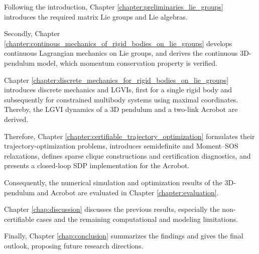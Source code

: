 Following the introduction, Chapter \ref{chapter:preliminaries_lie_groups} 
introduces the required matrix Lie groups and Lie algebras. 

Secondly, Chapter \ref{chapter:continous_mechanics_of_rigid_bodies_on_lie_groups} 
develops continuous Lagrangian mechanics on Lie groups,
and derives the continuous 3D-pendulum model, which momentum conservation
property is verified.

Chapter \ref{chapter:discrete_mechanics_for_rigid_bodies_on_lie_groups}
introduces discrete mechanics and LGVIs, first for a single rigid body
and subsequently for constrained multibody systems using maximal coordinates.
Thereby, the LGVI dynamics of a 3D pendulum and a two-link Acrobot are derived. 

Therefore, Chapter \ref{chapter:certifiable_trajectory_optimization}
formulates their trajectory-optimization problems,
introduces semidefinite and Moment--SOS relaxations, defines sparse clique
constructions and certification diagnostics, and presents a closed-loop
SDP implementation for the Acrobot.

Consequently, the numerical simulation  and optimization results 
of the 3D-pendulum and Acrobot are 
evaluated in Chapter \ref{chapter:evaluation}.

Chapter \ref{chap:discussion} discusses the previous results, especially 
the non-certifiable cases and the remaining computational and modeling limitations. 

Finally, Chapter \ref{chap:conclusion} summarizes the
findings and gives the final outlook, proposing future research directions.
